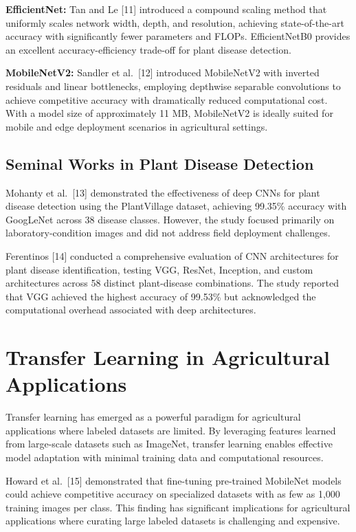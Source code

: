 \documentclass[12pt]{report}
\begin{document}
\textbf{EfficientNet:} Tan and Le [11] introduced a compound scaling method that uniformly scales network width, depth, and resolution, achieving state-of-the-art accuracy with significantly fewer parameters and FLOPs. EfficientNetB0 provides an excellent accuracy-efficiency trade-off for plant disease detection.

\textbf{MobileNetV2:} Sandler et al.\ [12] introduced MobileNetV2 with inverted residuals and linear bottlenecks, employing depthwise separable convolutions to achieve competitive accuracy with dramatically reduced computational cost. With a model size of approximately 11 MB, MobileNetV2 is ideally suited for mobile and edge deployment scenarios in agricultural settings.

\subsection{Seminal Works in Plant Disease Detection}

Mohanty et al.\ [13] demonstrated the effectiveness of deep CNNs for plant disease detection using the PlantVillage dataset, achieving 99.35\% accuracy with GoogLeNet across 38 disease classes. However, the study focused primarily on laboratory-condition images and did not address field deployment challenges.

Ferentinos [14] conducted a comprehensive evaluation of CNN architectures for plant disease identification, testing VGG, ResNet, Inception, and custom architectures across 58 distinct plant-disease combinations. The study reported that VGG achieved the highest accuracy of 99.53\% but acknowledged the computational overhead associated with deep architectures.

\section{Transfer Learning in Agricultural Applications}

Transfer learning has emerged as a powerful paradigm for agricultural applications where labeled datasets are limited. By leveraging features learned from large-scale datasets such as ImageNet, transfer learning enables effective model adaptation with minimal training data and computational resources.

Howard et al.\ [15] demonstrated that fine-tuning pre-trained MobileNet models could achieve competitive accuracy on specialized datasets with as few as 1,000 training images per class. This finding has significant implications for agricultural applications where curating large labeled datasets is challenging and expensive.
\end{document}
